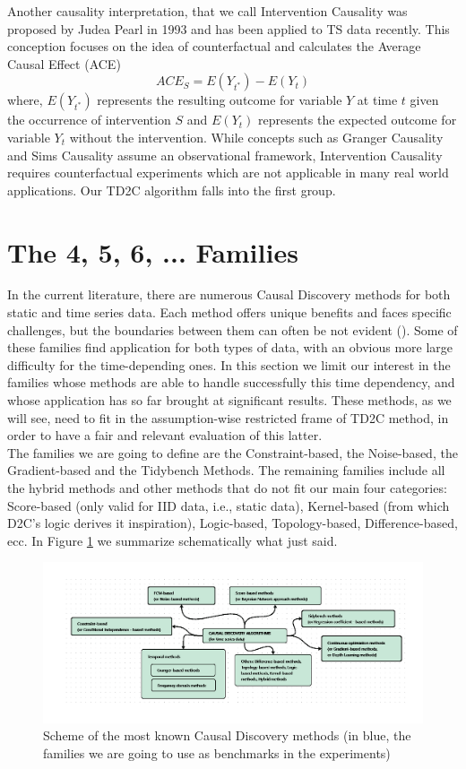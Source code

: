 Another causality interpretation, that we call Intervention Causality was proposed by Judea Pearl in 1993 and has been applied to TS data recently. This conception focuses on the idea of counterfactual and calculates the Average Causal Effect (ACE) $$ACE_S = E(Y_{t^*}) - E(Y_t)$$
where, $E(Y_{t^*})$ represents the resulting outcome for variable $Y$ at time $t$ given the occurrence of intervention $S$ and $E(Y_t)$ represents the expected outcome for variable $Y_t$ without the intervention. While concepts such as Granger Causality and Sims Causality assume an observational framework, Intervention Causality requires counterfactual experiments which are not applicable in many real world applications. Our TD2C algorithm falls into the first group. \cite{chang2021multivariate}\\

\section{The 4, 5, 6, ... Families}
In the current literature, there are numerous Causal Discovery methods for both static and time series data. Each method offers unique benefits and faces specific challenges, but the boundaries between them can often be not evident (\cite{hasan2023survey}). Some of these families find application for both types of data, with an obvious more large difficulty for the time-depending ones. In this section we limit our interest in the families whose methods are able to handle successfully this time dependency, and whose application has so far brought at significant results. These methods, as we will see, need to fit in the assumption-wise restricted frame of TD2C method, in order to have a fair and relevant evaluation of this latter.\\
The families we are going to define are the Constraint-based, the Noise-based, the Gradient-based and the Tidybench Methods. The remaining families include all the hybrid methods and other methods that do not fit our main four categories: Score-based (only valid for IID data, i.e., static data), Kernel-based (from which D2C's logic derives it inspiration), Logic-based, Topology-based, Difference-based, ecc. In Figure \ref{fig:2} we summarize schematically what just said.\\

\begin{figure}
    \centering
    \includegraphics[width=1\linewidth]{chapters/Images/Causal Discovery methods.png}
    \caption{Scheme of the most known Causal Discovery methods (in blue, the families we are going to use as benchmarks in the experiments)}
    \label{fig:2}
\end{figure}

